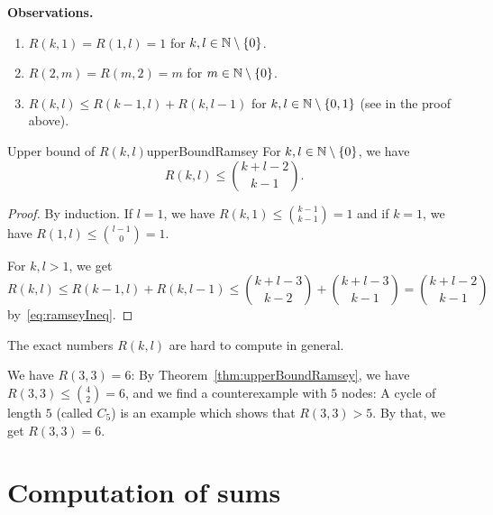 \documentclass[language=english]{../../Template/TemplateLecture}
\begin{document}

\textbf{Observations.}
\begin{enumerate}[$(i)$]
    \item $R(k,1) = R(1,l) = 1$ for $k, l \in \mathbb{N} \setminus \{0\}$.
    \item $R(2,m) = R(m,2) = m$ for $m \in \mathbb{N} \setminus \{0\}$.
    \item $R(k,l) \leq R(k-1,l) + R(k,l-1)$ for $k,l \in \mathbb{N} \setminus \{0,1\}$ (see in the proof above).
\end{enumerate}

\begin{thm}{Upper bound of $R(k,l)$}{upperBoundRamsey}
    For $k, l \in \mathbb{N} \setminus \{0\}$, we have 
    \begin{equation}
        R(k,l) \leq \binom{k + l - 2}{k - 1}.
    \end{equation}
\end{thm}

\begin{proof}
    By induction. If $l = 1$, we have $R(k,1) \leq \binom{k - 1}{k - 1} = 1$ and if $k = 1$, we have $R(1,l) \leq \binom{l-1}{0} = 1$. 

    For $k, l > 1$, we get 
    \begin{equation}
        R(k,l) \leq R(k-1,l) + R(k,l-1) \leq \binom{k+l-3}{k-2} + \binom{k+l-3}{k-1} = \binom{k+l-2}{k-1}
    \end{equation}
    by~\eqref{eq:ramseyIneq}.
\end{proof}

The exact numbers $R(k,l)$ are hard to compute in general.
\begin{beispiel}
    We have $R(3,3) = 6$: By Theorem~\ref{thm:upperBoundRamsey}, we have $R(3,3) \leq \binom{4}{2} = 6$, and we find a counterexample with $5$ nodes: A cycle of length $5$ (called $C_5$) is an example which shows that $R(3,3) > 5$. By that, we get $R(3,3) = 6$.
\end{beispiel}
 

\chapter{Computation of sums}
\end{document}
